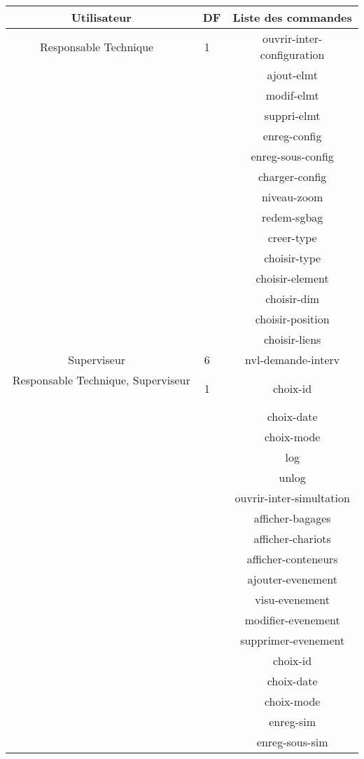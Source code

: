 \begin{center}
\begin{tabular}{|c|c|c|}
	 \hline \textbf{Utilisateur} & \textbf{DF} & \textbf{Liste des commandes} \\
\hline
	Responsable Technique ~&  1 ~& ouvrir-inter-configuration \\ 
	 ~&   ~& ajout-elmt \\ 
	 ~&   ~& modif-elmt \\ 
	 ~&   ~& suppri-elmt \\ 
	 ~&   ~& enreg-config \\ 
	 ~&   ~& enreg-sous-config \\ 
	 ~&   ~& charger-config \\ 
	 ~&   ~& niveau-zoom \\ 
	 ~&   ~& redem-sgbag \\ 
	 ~&   ~& creer-type \\ 
	 ~&   ~& choisir-type \\ 
	 ~&   ~& choisir-element \\ 
	 ~&   ~& choisir-dim \\ 
	 ~&   ~& choisir-position \\ 
	 ~&   ~& choisir-liens \\ 
\hline
	Superviseur ~&  6 ~& nvl-demande-interv \\ 
\hline
	Responsable Technique, Superviseur ~&  1 ~& choix-id \\ 
	 ~&   ~& choix-date \\ 
	 ~&   ~& choix-mode \\ 
	 ~&   ~& log \\ 
	 ~&   ~& unlog \\ 
	 ~&   ~& ouvrir-inter-simultation \\ 
	 ~&   ~& afficher-bagages \\ 
	 ~&   ~& afficher-chariots \\ 
	 ~&   ~& afficher-conteneurs \\ 
	 ~&   ~& ajouter-evenement \\ 
	 ~&   ~& visu-evenement \\ 
	 ~&   ~& modifier-evenement \\ 
	 ~&   ~& supprimer-evenement \\ 
	 ~&   ~& choix-id \\ 
	 ~&   ~& choix-date \\ 
	 ~&   ~& choix-mode \\ 
	 ~&   ~& enreg-sim \\ 
	 ~&   ~& enreg-sous-sim \\ 

\end{tabular}
\end{center}
